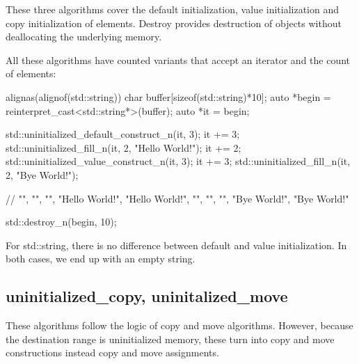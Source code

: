These three algorithms cover the default initialization, value initialization and copy initialization of elements. Destroy provides destruction of objects without deallocating the underlying memory.



All these algorithms have counted variants that accept an iterator and the count of elements:

\begin{box-note}
\begin{cppcode}
alignas(alignof(std::string)) char buffer[sizeof(std::string)*10];
auto *begin = reinterpret_cast<std::string*>(buffer);
auto *it = begin;

std::uninitialized_default_construct_n(it, 3);
it += 3;
std::uninitialized_fill_n(it, 2, "Hello World!");
it += 2;
std::uninitialized_value_construct_n(it, 3);
it += 3;
std::uninitialized_fill_n(it, 2, "Bye World!");

// {"", "", "", "Hello World!", "Hello World!", "", "", "", "Bye World!", "Bye World!"}

std::destroy_n(begin, 10);
\end{cppcode}
\end{box-note}

For std::string, there is no difference between default and value initialization. In both cases, we end up with an empty string.

\subsection{uninitialized\_copy, uninitalized\_move}



These algorithms follow the logic of copy and move algorithms. However, because the destination range is uninitialized memory, these turn into copy and move constructions instead copy and move assignments.

